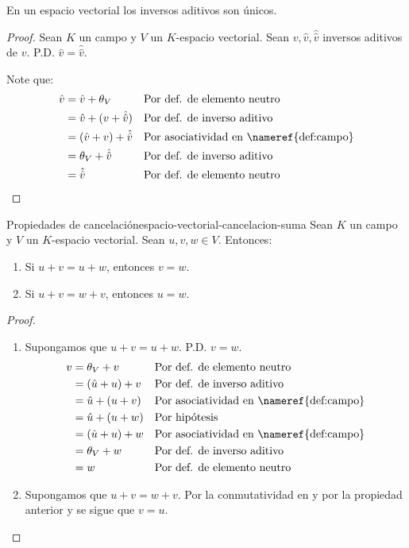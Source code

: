 \begin{proposition}{}{}
    En un espacio vectorial los inversos aditivos son únicos.
\end{proposition}
\begin{proof}
    Sean $K$ un campo y $V$ un $K$-espacio vectorial. Sean $v, \hat{v}, \hat{\hat{v}}$ inversos aditivos de $v$. P.D. $\hat{v} = \hat{\hat{v}}$.

    Note que:
    \begin{align*}
        \hat{v} &= \hat{v} + \theta_V && \text{Por def. de elemento neutro} \\
        &= \hat{v} + (v + \hat{\hat{v}}) && \text{Por def. de inverso aditivo} \\
        &= (\hat{v} + v) + \hat{\hat{v}} && \text{Por asociatividad en \nameref{def:campo}} \\
        &= \theta_V + \hat{\hat{v}} && \text{Por def. de inverso aditivo} \\
        &= \hat{\hat{v}} && \text{Por def. de elemento neutro}
    \end{align*}
\end{proof}


\begin{proposition}{Propiedades de cancelación}{espacio-vectorial-cancelacion-suma}
    Sean $K$ un campo y $V$ un $K$-espacio vectorial. Sean $u,v,w\in V$. Entonces:
    \begin{enumerate}
        \item Si $u+v=u+w$, entonces $v=w$.
        \item Si $u+v=w+v$, entonces $u=w$.
    \end{enumerate}
\end{proposition}
\begin{proof}
    \begin{enumerate}
        \item Supongamos que $u+v=u+w$. P.D. $v=w$.
        \begin{align*}
            v &= \theta_V + v && \text{Por def. de elemento neutro} \\
            &= (\hat{u} + u) + v && \text{Por def. de inverso aditivo} \\
            &= \hat{u} + (u + v) && \text{Por asociatividad en \nameref{def:campo}} \\
            &= \hat{u} + (u + w) && \text{Por hipótesis} \\
            &= (\hat{u} + u) + w && \text{Por asociatividad en \nameref{def:campo}} \\
            &= \theta_V + w && \text{Por def. de inverso aditivo} \\
            &= w && \text{Por def. de elemento neutro}
        \end{align*}
        \item Supongamos que $u+v=w+v$. Por la conmutatividad en  y por la propiedad anterior y se sigue que $v=u$.
    \end{enumerate}
\end{proof}


